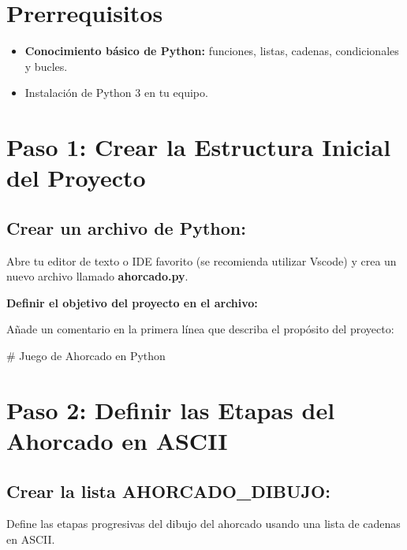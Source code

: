 \documentclass[
  a4paper,
  DIV=11,
  numbers=noendperiod,
  onepage,
  openany]{scrreprt}
\newenvironment{Shaded}{\begin{snugshade}}{\end{snugshade}}
\newcommand{\CommentTok}[1]{\textcolor[rgb]{0.37,0.37,0.37}{#1}}
\begin{document}
\section{Prerrequisitos}\label{prerrequisitos}

\begin{itemize}
\item
  \textbf{Conocimiento básico de Python:} funciones, listas, cadenas,
  condicionales y bucles.
\item
  Instalación de Python 3 en tu equipo.
\end{itemize}

\section{Paso 1: Crear la Estructura Inicial del
Proyecto}\label{paso-1-crear-la-estructura-inicial-del-proyecto}

\subsection{Crear un archivo de
Python:}\label{crear-un-archivo-de-python}

Abre tu editor de texto o IDE favorito (se recomienda utilizar Vscode) y
crea un nuevo archivo llamado \textbf{ahorcado.py}.

\textbf{Definir el objetivo del proyecto en el archivo:}

Añade un comentario en la primera línea que describa el propósito del
proyecto:

\begin{Shaded}
\begin{Highlighting}[]
\CommentTok{\# Juego de Ahorcado en Python}
\end{Highlighting}
\end{Shaded}

\section{Paso 2: Definir las Etapas del Ahorcado en
ASCII}\label{paso-2-definir-las-etapas-del-ahorcado-en-ascii}

\subsection{Crear la lista
AHORCADO\_DIBUJO:}\label{crear-la-lista-ahorcado_dibujo}

Define las etapas progresivas del dibujo del ahorcado usando una lista
de cadenas en ASCII.
\end{document}
